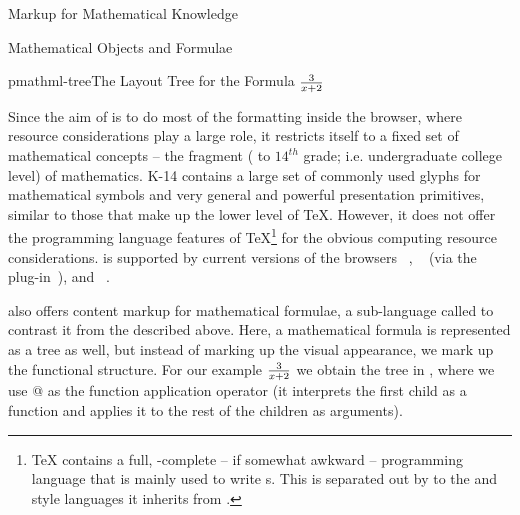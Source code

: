 \begin{omgroup}[id=math-markup]{Markup for Mathematical Knowledge}
\begin{omgroup}[id=math-objects]{Mathematical Objects and Formulae}
\begin{omgroup}[id=math-markup.mathml]{\mathml}
\begin{myfig}{pmathml-tree}{The Layout Tree for the Formula $3\over x+2$}
\begin{minipage}{8cm}
\end{minipage}  
\end{myfig}

Since the aim of {\mathml} is to do most of the formatting inside the browser, where
resource considerations play a large role, it restricts itself to a fixed set of
mathematical concepts -- the {} fragment ({} to
$14^{th}$ grade; i.e. undergraduate college level) of mathematics. K-14 contains a large
set of commonly used glyphs for mathematical symbols and very general and powerful
presentation primitives, similar to those that make up the lower level of {\TeX}.
However, it does not offer the programming language features of {\TeX}\footnote{{\TeX}
  contains a full, {}-complete -- if somewhat awkward -- programming
  language that is mainly used to write {}s.  This is separated out
  by {\mathml} to the {\css} and {\xslt} style languages it inherits from {\xml}.}  for
the obvious computing resource considerations.  {\pmathml} is supported by current
versions of the browsers {\amaya}~\cite{amaya_web}, {\msie}~\cite{ie_web} (via the
{\mathplayer} plug-in~\cite{mathplayer_web}), and {\mozilla}~\cite{mozilla_web}.

  {\mathml} also offers content markup for mathematical formulae, a sub-language called
  {} to contrast it from the {} described
  above. Here, a mathematical formula is represented as a tree as well, but instead of
  marking up the visual appearance, we mark up the functional structure. For our example
  $3\over x+2$ we obtain the tree in {}, where we use @ as the
  function application operator (it interprets the first child as a function and applies
  it to the rest of the children as arguments).


\end{omgroup}
\end{omgroup}
\end{omgroup}
